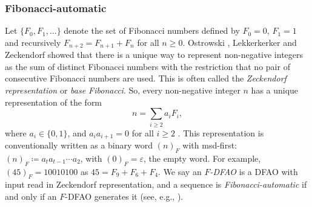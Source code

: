 \documentclass[10pt,a4paper,reqno]{amsart}
\begin{document}
\subsubsection{Fibonacci-automatic}
Let $\{F_0,F_1,\ldots\}$ denote the set of Fibonacci numbers defined by $F_0=0$, $F_1=1$ and recursively $F_{n+2}=F_{n+1}+F_{n}$ for all $n\geq0$. Ostrowski \cite{ostro1922}, Lekkerkerker \cite{lekker1951} and Zeckendorf \cite{zecken1972} showed that there is a unique way to represent non-negative integers as the sum of distinct Fibonacci numbers with the restriction that no pair of consecutive Fibonacci numbers are used. This is often called the {\em Zeckendorf representation} or {\em base Fibonacci}.
So, every non-negative integer $n$ has a unique representation of the form
\[n=\sum_{i \geq 2} a_iF_i,\]
where $a_i\in\{0, 1\}$, and $a_ia_{i+1} = 0$ for all $i\geq 2$ \cite{csh1972}. This representation is conventionally written as a binary word $(n)_F$ with msd-first: $(n)_F \coloneqq a_ta_{t-1}\cdots a_2$, with $(0)_F = \varepsilon$, the empty word. For example, $(45)_F=10010100$ as $45=F_9+F_6+F_4$. 
We say an {\em $F$-DFAO} is a DFAO with input read in Zeckendorf representation, and a sequence is {\em Fibonacci-automatic} if and only if an $F$-DFAO generates it (see, e.g., \cite[Section 5.9]{shallit2022}).
\end{document}
